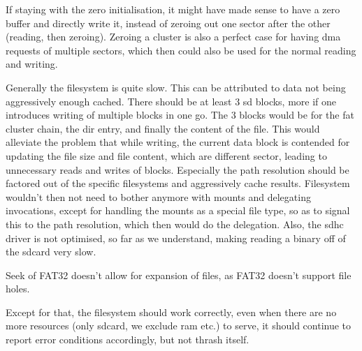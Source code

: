 If staying with the zero initialisation, it might have made sense to have a zero
buffer and directly write it, instead of zeroing out one sector after the other
(reading, then zeroing).
Zeroing a cluster is also a perfect case for having dma requests of multiple
sectors, which then could also be used for the normal reading and writing.

Generally the filesystem is quite slow.
This can be attributed to data not being aggressively enough cached.
There should be at least 3 sd blocks, more if one introduces writing of multiple
blocks in one go.
The 3 blocks would be for the fat cluster chain, the dir entry, and finally the
content of the file.
This would alleviate the problem that while writing, the current data block is
contended for updating the file size and file content, which are different
sector, leading to unnecessary reads and writes of blocks.
Especially the path resolution should be factored out of the specific
filesystems and aggressively cache results.
Filesystem wouldn't then not need to bother anymore with mounts and delegating
invocations, except for handling the mounts as a special file type, so as to
signal this to the path resolution, which then would do the delegation.
Also, the sdhc driver is not optimised, so far as we understand, making reading
a binary off of the sdcard very slow.

Seek of FAT32 doesn't allow for expansion of files, as FAT32 doesn't support
file holes.

Except for that, the filesystem should work correctly, even when there are no
more resources (only sdcard, we exclude ram etc.) to serve, it should continue
to report error conditions accordingly, but not thrash itself.
